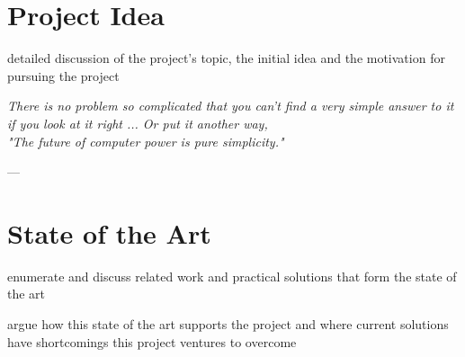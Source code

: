 \chapter{Project Idea}
\label{chp:idea}

\begin{shaded}
\noindent
detailed discussion of the project's topic, the initial idea and the motivation for pursuing the project
\end{shaded}

\begin{center}
\slshape
There is no problem so complicated that you can't find a very simple answer to it if you look at it right ...
Or put it another way, \\
"The future of computer power is pure simplicity."
\end{center}
\begin{flushright}
    ---  \citep{Adams2002}
\end{flushright}

\lipsum[8-10]

\chapter{State of the Art}
\label{chp:stateoftheart}

\begin{shaded}
\noindent
enumerate and discuss related work and practical solutions that form the state of the art

\medskip

\noindent
argue how this state of the art supports the project and where current solutions have shortcomings this project ventures to overcome
\end{shaded}

\lipsum[11-20]
